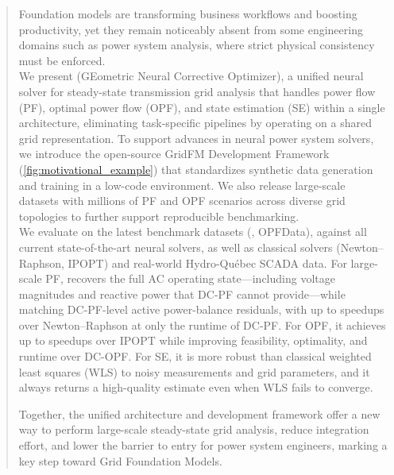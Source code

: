 \begin{abstract}

\vspace{-0.4em}

Foundation models are transforming business workflows and boosting productivity, yet they remain noticeably absent from some engineering domains such as power system analysis, where strict physical consistency must be enforced.\\

We present \genco (GEometric Neural Corrective Optimizer), a unified neural solver for steady-state transmission grid analysis that handles power flow (PF), optimal power flow (OPF), and state estimation (SE) within a single architecture, eliminating task-specific pipelines by operating on a shared grid representation. To support advances in neural power system solvers, we introduce the open-source GridFM Development Framework (\cref{fig:motivational_example}) that standardizes synthetic data generation and training in a low-code environment. We also release large-scale datasets with millions of PF and OPF scenarios across diverse grid topologies to further support reproducible benchmarking.\\

We evaluate \genco on the latest benchmark datasets (\pfdelta, OPFData), against all current state-of-the-art neural solvers, as well as classical solvers (Newton–Raphson, IPOPT) and real-world Hydro-Québec SCADA data. For large-scale PF, \genco recovers the full AC operating state---including voltage magnitudes and reactive power that DC-PF cannot provide---while matching DC-PF-level active power-balance residuals, with up to \maxpfspeedups speedups over Newton–Raphson at only \dcpfspeedupovergenco the runtime of DC-PF. For OPF, it achieves up to \maxopfspeedups speedups over IPOPT while improving feasibility, optimality, and runtime over DC-OPF. For SE, it is more robust than classical weighted least squares (WLS) to noisy measurements and grid parameters, and it always returns a high-quality estimate even when WLS fails to converge.

Together, the unified architecture and development framework offer a new way to perform large-scale steady-state grid analysis, reduce integration effort, and lower the barrier to entry for power system engineers, marking a key step toward Grid Foundation Models.

\vspace{-5pt}

\end{abstract}